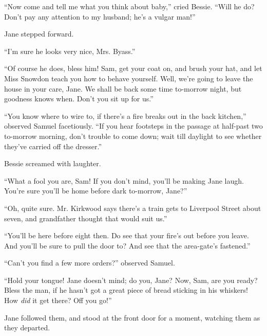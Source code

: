 ``Now come and tell me what you think about baby,'' cried Bessie. ``Will
he do? Don't pay any attention to my husband; he's a vulgar man!''

Jane stepped forward.

``I'm sure he looks very nice, Mrs. Byass.''

``Of course he does, bless him! Sam, get your coat on, and brush your
hat, and let Miss Snowdon teach you how to behave yourself. Well, we're
going to leave the house in your care, Jane. We shall be back some time
to-morrow night, but goodness knows when. Don't you sit up for us.''

``You know where to wire to, if there's a fire breaks out in the back
kitchen,'' observed Samuel facetiously. ``If you hear footsteps
{\protect\hypertarget{239}{}{}}in the passage at half-past two to-morrow
morning, don't trouble to come down; wait till daylight to see whether
they've carried off the dresser.''

Bessie screamed with laughter.

``What a fool you are, Sam! If you don't mind, you'll be making Jane
laugh. You're sure you'll be home before dark to-morrow, Jane?''

``Oh, quite sure. Mr. Kirkwood says there's a train gets to Liverpool
Street about seven, and grandfather thought that would suit us.''

``You'll be here before eight then. Do see that your fire's out before
you leave. And you'll be sure to pull the door to? And see that the
area-gate's fastened.''

``Can't you find a few more orders?'' observed Samuel.

``Hold your tongue! Jane doesn't mind; do you, Jane? Now, Sam, are you
ready? Bless the man, if he hasn't got a great piece of bread sticking
in his whiskers! How \emph{did} it get there? Off you go!''

{\protect\hypertarget{240}{}{}}Jane followed them, and stood at the
front door for a moment, watching them as they departed.

